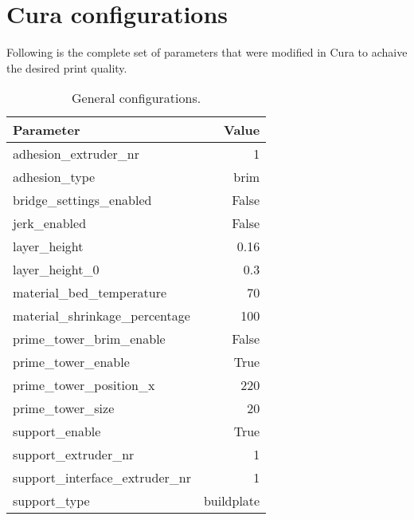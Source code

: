 \section{Cura configurations}
Following is the complete set of parameters that were modified in Cura to achaive the desired print quality.
\begin{table}[H]
    \centering
    \scriptsize
    \begin{tabular}{ |l|r| }
        \hline
        \textbf{Parameter}               & \textbf{Value} \\
        \hline
        adhesion\_extruder\_nr           & 1              \\
        adhesion\_type                   & brim           \\
        bridge\_settings\_enabled        & False          \\
        jerk\_enabled                    & False          \\
        layer\_height                    & 0.16           \\
        layer\_height\_0                 & 0.3            \\
        material\_bed\_temperature       & 70             \\
        material\_shrinkage\_percentage  & 100            \\
        prime\_tower\_brim\_enable       & False          \\
        prime\_tower\_enable             & True           \\
        prime\_tower\_position\_x        & 220            \\
        prime\_tower\_size               & 20             \\
        support\_enable                  & True           \\
        support\_extruder\_nr            & 1              \\
        support\_interface\_extruder\_nr & 1              \\
        support\_type                    & buildplate     \\
        \hline
    \end{tabular}
    \caption{General configurations.}
\end{table}
\pagebreak
